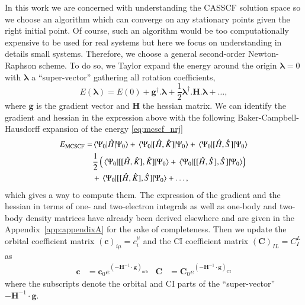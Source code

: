 \documentclass[aps,prb,reprint,showkeys,superscriptaddress]{revtex4-1}
\begin{document}
In this work we are concerned with understanding the CASSCF solution space so we choose an algorithm which can converge on any stationary points given the right initial point.
Of course, such an algorithm would be too computationally expensive to be used for real systems but here we focus on understanding in details small systems.
Therefore, we choose a general second-order Newton-Raphson scheme. \cite{Olsen_1983}
To do so, we Taylor expand the energy around the origin $\bm{\lambda}=0$ with $\bm{\lambda}$ a ``super-vector'' gathering all rotation coefficients,
\begin{equation}
  \label{eq:mcscf_nrj_taylor}
  E(\bm{\lambda}) = E(0) + \boldsymbol{g}^\dagger.\bm{\lambda} + \frac{1}{2} \bm{\lambda}^\dagger.\boldsymbol{H}.\bm{\lambda} + \dots,
\end{equation}
where $\bm{g}$ is the gradient vector and $\bm{H}$ the hessian matrix.
We can identify the gradient and hessian in the expression above with the following Baker-Campbell-Hausdorff expansion of the energy \eqref{eq:mcscf_nrj}
\begin{equation}
  \label{eq:mcscf_nrj_bch}
  \begin{split}
    E_{\text{MCSCF}} = &\mel{\Psi_0}{\Hat{H}}{\Psi_0} + \mel{\Psi_0}{[\Hat{H},\Hat{K}]}{\Psi_0} + \mel{\Psi_0}{[\Hat{H},\Hat{S}]}{\Psi_0}  \\
    &\frac{1}{2} \left(\mel{\Psi_0}{[[\Hat{H},\Hat{K}],\Hat{K}]}{\Psi_0}+ \mel{\Psi_0}{[[\Hat{H},\Hat{S}],\Hat{S}]}{\Psi_0}\right) \\
    &+ \mel{\Psi_0}{[[\Hat{H},\Hat{K}],\Hat{S}]}{\Psi_0} + \dots,
  \end{split}
\end{equation}
which gives a way to compute them.
The expression of the gradient and the hessian in terms of one- and two-electron integrals as well as one-body and two-body density matrices have already been derived elsewhere \cite{Olsen_1983} and are given in the Appendix~\ref{app:appendixA} for the sake of completeness.
Then we update the orbital coefficient matrix $(\bm{c})_{i \mu} = c_i^\mu$ and the CI coefficient matrix $(\bm{C})_{IL} = C_I^L$ as
\begin{align}
  \bm{c} &= \bm{c}_0 e^{(-\bm{H}^{-1}\cdot \bm{g})_{\text{orb}}} & \bm{C} &= \bm{C}_0 e^{(-\bm{H}^{-1}\cdot \bm{g})_{\text{CI}}}
\end{align}
where the subscripts denote the orbital and CI parts of the ``super-vector'' $-\bm{H}^{-1}\cdot \bm{g}$.
\end{document}

